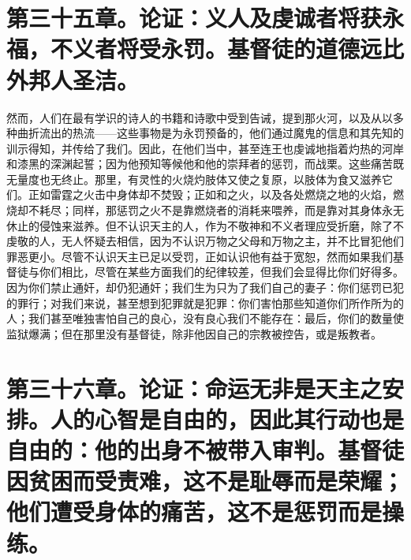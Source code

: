 
\section{第三十五章。论证：义人及虔诚者将获永福，不义者将受永罚。基督徒的道德远比外邦人圣洁。}

然而，人们在最有学识的诗人的书籍和诗歌中受到告诫，提到那火河，以及从以多种曲折流出的热流——这些事物是为永罚预备的，他们通过魔鬼的信息和其先知的训示得知，并传给了我们。因此，在他们当中，甚至连王也虔诚地指着灼热的河岸和漆黑的深渊起誓；因为他预知等候他和他的崇拜者的惩罚，而战栗。这些痛苦既无量度也无终止。那里，有灵性的火烧灼肢体又使之复原，以肢体为食又滋养它们。正如雷霆之火击中身体却不焚毁；正如和之火，以及各处燃烧之地的火焰，燃烧却不耗尽；同样，那惩罚之火不是靠燃烧者的消耗来喂养，而是靠对其身体永无休止的侵蚀来滋养。但不认识天主的人，作为不敬神和不义者理应受折磨，除了不虔敬的人，无人怀疑去相信，因为不认识万物之父母和万物之主，并不比冒犯他们罪恶更小。尽管不认识天主已足以受罚，正如认识他有益于宽恕，然而如果我们基督徒与你们相比，尽管在某些方面我们的纪律较差，但我们会显得比你们好得多。因为你们禁止通奸，却仍犯通奸；我们生为只为了我们自己的妻子：你们惩罚已犯的罪行；对我们来说，甚至想到犯罪就是犯罪：你们害怕那些知道你们所作所为的人；我们甚至唯独害怕自己的良心，没有良心我们不能存在：最后，你们的数量使监狱爆满；但在那里没有基督徒，除非他因自己的宗教被控告，或是叛教者。\par


\section{第三十六章。论证：命运无非是天主之安排。人的心智是自由的，因此其行动也是自由的：他的出身不被带入审判。基督徒因贫困而受责难，这不是耻辱而是荣耀；他们遭受身体的痛苦，这不是惩罚而是操练。}

